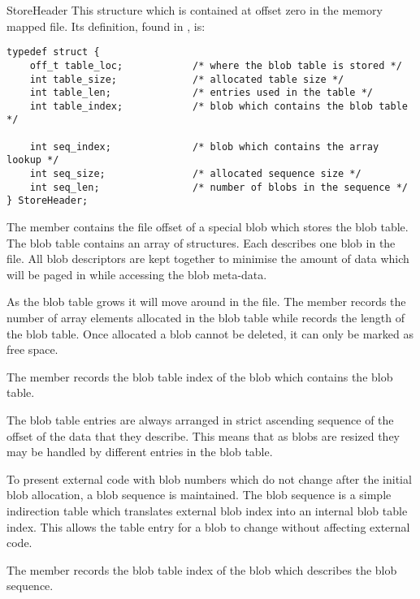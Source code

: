 \begin{ctypedesc}[StoreHeader]{StoreHeader}
This structure which is contained at offset zero in the memory mapped
file.  Its definition, found in , is:

\begin{verbatim}
typedef struct {
    off_t table_loc;            /* where the blob table is stored */
    int table_size;             /* allocated table size */
    int table_len;              /* entries used in the table */
    int table_index;            /* blob which contains the blob table */

    int seq_index;              /* blob which contains the array lookup */
    int seq_size;               /* allocated sequence size */
    int seq_len;                /* number of blobs in the sequence */
} StoreHeader;
\end{verbatim}

The  member contains the file offset of a special blob
which stores the blob table.  The blob table contains an array of
 structures.  Each  describes one blob
in the file.  All blob descriptors are kept together to minimise the
amount of data which will be paged in while accessing the blob
meta-data.

As the blob table grows it will move around in the file.  The
 member records the number of array elements
allocated in the blob table while  records the length
of the blob table.  Once allocated a blob cannot be deleted, it can
only be marked as free space.

The  member records the blob table index of the blob
which contains the blob table.

The blob table entries are always arranged in strict ascending
sequence of the offset of the data that they describe.  This means
that as blobs are resized they may be handled by different entries in
the blob table.

To present external code with blob numbers which do not change after
the initial blob allocation, a blob sequence is maintained.  The blob
sequence is a simple indirection table which translates external blob
index into an internal blob table index.  This allows the table entry
for a blob to change without affecting external code.

The  member records the blob table index of the blob
which describes the blob sequence.
\end{ctypedesc}

